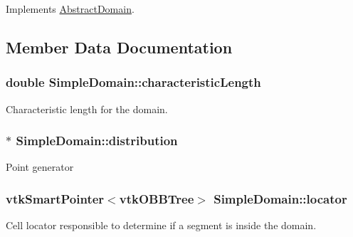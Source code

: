 Implements \hyperlink{class_abstract_domain_a8544eef21fb6700ecc02e9cd50884efd}{Abstract\+Domain}.



\subsection{Member Data Documentation}
\subsubsection[{\texorpdfstring{characteristic\+Length}{characteristicLength}}]{\setlength{\rightskip}{0pt plus 5cm}double Simple\+Domain\+::characteristic\+Length\hspace{0.3cm}{\ttfamily [private]}}\hypertarget{class_simple_domain_a9071107204a54d35605996d7a55b0018}{}\label{class_simple_domain_a9071107204a54d35605996d7a55b0018}
Characteristic length for the domain. 
\subsubsection[{\texorpdfstring{distribution}{distribution}}]{$\ast$ Simple\+Domain\+::distribution\hspace{0.3cm}{\ttfamily [private]}}\hypertarget{class_simple_domain_a522b7ae1a103ca9fe78607d5bffab4f2}{}\label{class_simple_domain_a522b7ae1a103ca9fe78607d5bffab4f2}
Point generator 
\subsubsection[{\texorpdfstring{locator}{locator}}]{\setlength{\rightskip}{0pt plus 5cm}vtk\+Smart\+Pointer$<$vtk\+O\+B\+B\+Tree$>$ Simple\+Domain\+::locator\hspace{0.3cm}{\ttfamily [private]}}\hypertarget{class_simple_domain_af70c4b3e6786d3ec9fffa3cc25c9e59f}{}\label{class_simple_domain_af70c4b3e6786d3ec9fffa3cc25c9e59f}
Cell locator responsible to determine if a segment is inside the domain. 
